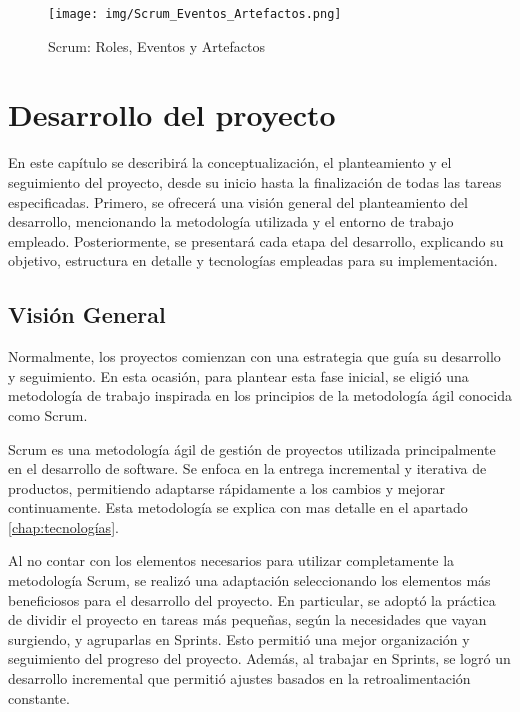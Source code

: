 \documentclass[a4paper, 12pt]{book}
\begin{document}
\begin{figure}[H]
  \centering
  \texttt{[image: img/Scrum\_Eventos\_Artefactos.png]}
  \caption{Scrum: Roles, Eventos y Artefactos}
  \label{fig:roles}
\end{figure}



\chapter{Desarrollo del proyecto}
\label{sec:Desarrollo}

En este capítulo se describirá la conceptualización, el planteamiento y el seguimiento del proyecto, desde su inicio hasta la finalización de todas las tareas especificadas. Primero, se ofrecerá una visión general del planteamiento del desarrollo, mencionando la metodología utilizada y el entorno de trabajo empleado. Posteriormente, se presentará cada etapa del desarrollo, explicando su objetivo, estructura en detalle y tecnologías empleadas para su implementación.

\section{Visión General} 

Normalmente, los proyectos comienzan con una estrategia que guía su desarrollo y seguimiento. En esta ocasión, para plantear esta fase inicial, se eligió una metodología de trabajo inspirada en los principios de la metodología ágil conocida como Scrum.

Scrum es una metodología ágil de gestión de proyectos utilizada principalmente en el desarrollo de software. Se enfoca en la entrega incremental y iterativa de productos, permitiendo adaptarse rápidamente a los cambios y mejorar continuamente. Esta metodología se explica con mas detalle en el apartado \ref{chap:tecnologías}.

Al no contar con los elementos necesarios para utilizar completamente la metodología Scrum, se realizó una adaptación seleccionando los elementos más beneficiosos para el desarrollo del proyecto. En particular, se adoptó la práctica de dividir el proyecto en tareas más pequeñas, según la necesidades que vayan surgiendo, y agruparlas en Sprints. Esto permitió una mejor organización y seguimiento del progreso del proyecto. Además, al trabajar en Sprints, se logró un desarrollo incremental que permitió ajustes basados en la retroalimentación constante.
\end{document}

